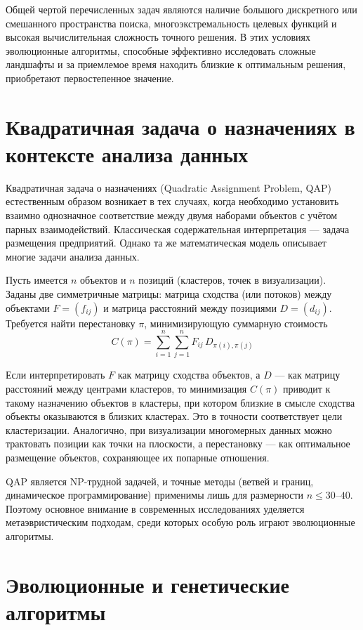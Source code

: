 \documentclass[732]{studrep}
\theoremstyle{nonumberplain}
\begin{document}
Общей чертой перечисленных задач являются наличие большого дискретного или смешанного пространства поиска, многоэкстремальность целевых функций и высокая вычислительная сложность точного решения. В этих условиях эволюционные алгоритмы, способные эффективно исследовать сложные ландшафты и за приемлемое время находить близкие к оптимальным решения, приобретают первостепенное значение.

\section{Квадратичная задача о назначениях в контексте анализа данных}
\label{sec:qap}

Квадратичная задача о назначениях (Quadratic Assignment Problem, QAP) естественным образом возникает в тех случаях, когда необходимо установить взаимно однозначное соответствие между двумя наборами объектов с учётом парных взаимодействий. Классическая содержательная интерпретация — задача размещения предприятий. Однако та же математическая модель описывает многие задачи анализа данных.

Пусть имеется $n$ объектов и $n$ позиций (кластеров, точек в визуализации). Заданы две симметричные матрицы: матрица сходства (или потоков) между объектами $F = (f_{ij})$ и матрица расстояний между позициями $D = (d_{ij})$. Требуется найти перестановку $\pi$, минимизирующую суммарную стоимость
\[
C(\pi) = \sum_{i=1}^{n}\sum_{j=1}^{n} F_{ij}\, D_{\pi(i),\pi(j)}
\]

Если интерпретировать $F$ как матрицу сходства объектов, а $D$ — как матрицу расстояний между центрами кластеров, то минимизация $C(\pi)$ приводит к такому назначению объектов в кластеры, при котором близкие в смысле сходства объекты оказываются в близких кластерах. Это в точности соответствует цели кластеризации. Аналогично, при визуализации многомерных данных можно трактовать позиции как точки на плоскости, а перестановку — как оптимальное размещение объектов, сохраняющее их попарные отношения.

QAP является NP-трудной задачей, и точные методы (ветвей и границ, динамическое программирование) применимы лишь для размерности $n \leq 30\text{–}40$. Поэтому основное внимание в современных исследованиях уделяется метаэвристическим подходам, среди которых особую роль играют эволюционные алгоритмы.

\section{Эволюционные и генетические алгоритмы}
\end{document}

